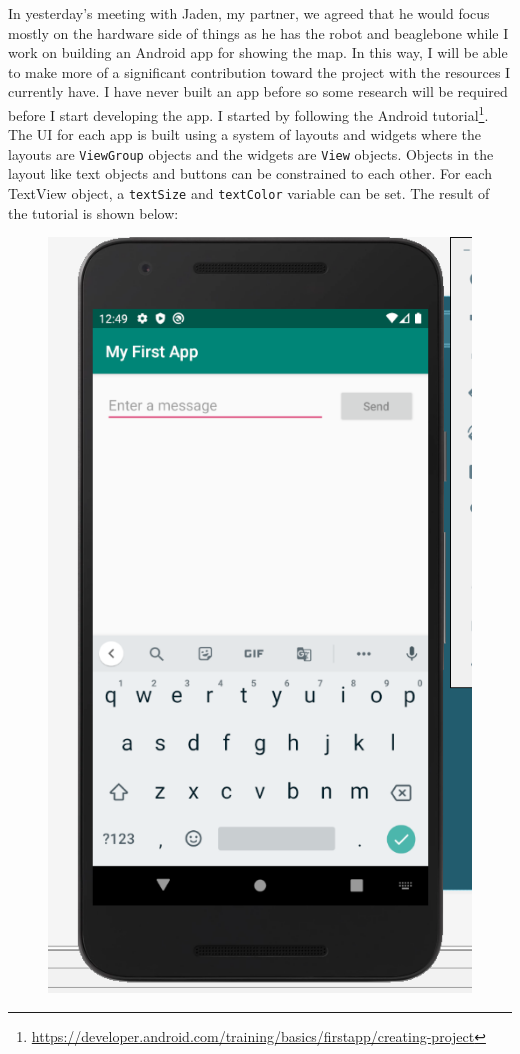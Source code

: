 \documentclass[fontsize=11pt, %
                             paper=a4, %
                             twoside, %
                             captions=tableheading,
                             index=totoc,
                             hyperref]{labbook}
\begin{document}
\begin{addmargin}[0cm]{0cm}
In yesterday's meeting with Jaden, my partner, we agreed that he would focus mostly on the hardware side of things as he has the robot and beaglebone while I work on building an Android app for showing the map. In this way, I will be able to make more of a significant contribution toward the project with the resources I currently have. I have never built an app before so some research will be required before I start developing the app.
\smallbreak\noindent
I started by following the Android tutorial\footnote{\url{https://developer.android.com/training/basics/firstapp/creating-project}}. The UI for each app is built using a system of layouts and widgets where the layouts are \texttt{ViewGroup} objects and the widgets are \texttt{View} objects. Objects in the layout like text objects and buttons can be constrained to each other. For each TextView object, a \texttt{textSize} and \texttt{textColor} variable can be set. The result of the tutorial is shown below:
\begin{figure}[H]
\centering
\includegraphics[scale=0.5]{figs/img/myFirstApp}

\end{figure}
\end{addmargin}
\end{document}
